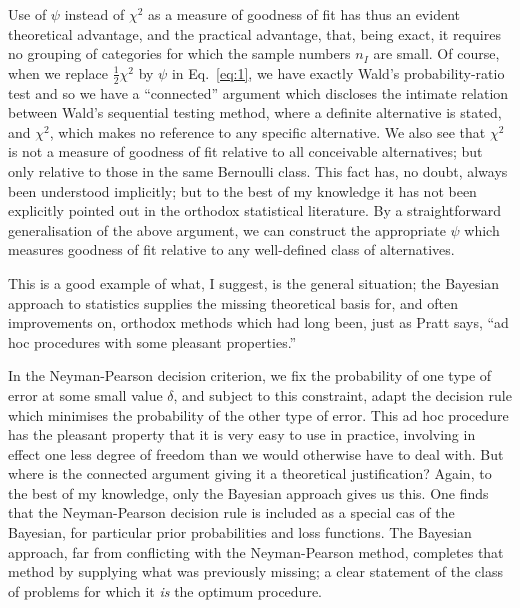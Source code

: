 \documentclass[12pt]{article}
\newcommand{\refeq}[1]{Eq.~\ref{#1}}
\begin{document}
Use of $\psi$ instead of $\chi^2$ as a measure of goodness of fit has thus an evident theoretical advantage, and the practical advantage, that, being exact, it requires no grouping of categories for which the sample numbers $n_I$ are small. Of course, when we replace $\frac12 \chi^2$ by $\psi$ in \refeq{eq:1}, we have exactly Wald's probability-ratio test and so we have a ``connected'' argument which discloses the intimate relation between Wald's sequential testing method, where a definite alternative is stated, and $\chi^2$, which makes no reference to any specific alternative. We also see that $\chi^2$ is not a measure of goodness of fit relative to all conceivable alternatives; but only relative to those in the same Bernoulli class. This fact has, no doubt, always been understood implicitly; but to the best of my knowledge it has not been explicitly pointed out in the orthodox statistical literature. By a straightforward generalisation of the above
argument, we can construct the appropriate $\psi$ which measures goodness of fit relative to any well-defined class of alternatives.

This is a good example of what, I suggest, is the general situation;
the Bayesian approach to statistics supplies the missing theoretical
basis for, and often improvements on, orthodox methods which had long
been, just as Pratt says, ``ad hoc procedures with some pleasant
properties.''

In the Neyman-Pearson decision criterion, we fix the probability
of one type of error at some small value $\delta$, and subject to this constraint, adapt the decision rule which minimises the probability
of the other type of error. This ad hoc procedure has the pleasant
property that it is very easy to use in practice, involving in effect
one less degree of freedom than we would otherwise have to deal with.
But where is the connected argument giving it a theoretical justification?
Again, to the best of my knowledge, only the Bayesian approach gives us
this. One finds that the Neyman-Pearson decision rule is included as a
special cas of the Bayesian, for particular prior probabilities and
loss functions. The Bayesian approach, far from conflicting with the
Neyman-Pearson method, completes that method by supplying what was
previously missing; a clear statement of the class of problems for
which it \emph{is} the optimum procedure.
\end{document}
